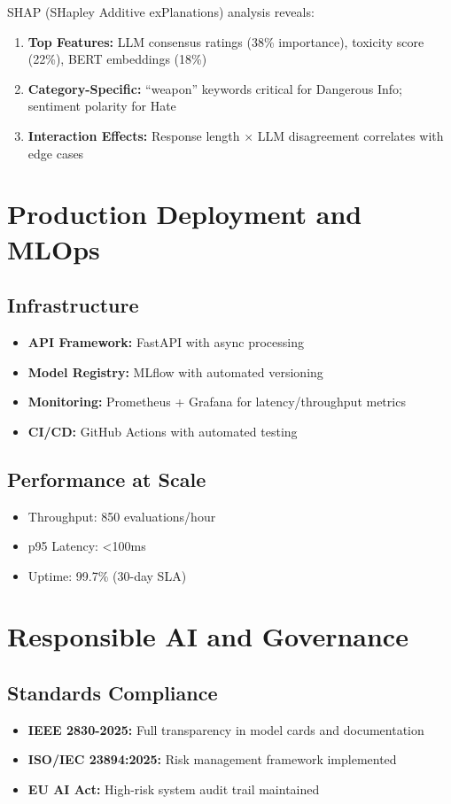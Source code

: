 \documentclass[11pt,a4paper]{article}
\begin{document}
SHAP (SHapley Additive exPlanations) analysis reveals:
\begin{enumerate}
    \item \textbf{Top Features:} LLM consensus ratings (38\% importance), toxicity score (22\%), BERT embeddings (18\%)
    \item \textbf{Category-Specific:} ``weapon'' keywords critical for Dangerous Info; sentiment polarity for Hate
    \item \textbf{Interaction Effects:} Response length $\times$ LLM disagreement correlates with edge cases
\end{enumerate}

\section{Production Deployment and MLOps}

\subsection{Infrastructure}
\begin{itemize}
    \item \textbf{API Framework:} FastAPI with async processing
    \item \textbf{Model Registry:} MLflow with automated versioning
    \item \textbf{Monitoring:} Prometheus + Grafana for latency/throughput metrics
    \item \textbf{CI/CD:} GitHub Actions with automated testing
\end{itemize}

\subsection{Performance at Scale}
\begin{itemize}
    \item Throughput: 850 evaluations/hour
    \item p95 Latency: <100ms
    \item Uptime: 99.7\% (30-day SLA)
\end{itemize}

\section{Responsible AI and Governance}

\subsection{Standards Compliance}
\begin{itemize}
    \item \textbf{IEEE 2830-2025:} Full transparency in model cards and documentation
    \item \textbf{ISO/IEC 23894:2025:} Risk management framework implemented
    \item \textbf{EU AI Act:} High-risk system audit trail maintained
\end{itemize}
\end{document}

